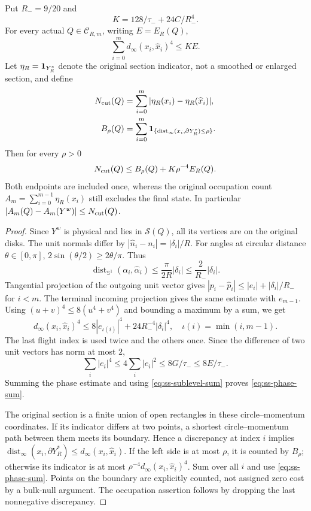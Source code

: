 \begin{theorem}
\label{thm:ss-section}
Put $R_-=9/20$ and
\begin{equation}\label{eq:ss-phase-constant}
 K=128/\tau_-+24C/R_-^4.
\end{equation}
For every actual $Q\in\mathcal C_{R,m}$, writing $E=E_R(Q)$,
\begin{equation}\label{eq:ss-phase-sum}
 \sum_{i=0}^m d_\infty(x_i,\widehat x_i)^4\le KE.
\end{equation}
Let $\eta_R=\mathbf1_{Y_R^*}$ denote the original section indicator, not a
smoothed or enlarged section, and define
\begin{align*}
 N_{\rm cut}(Q)&=\sum_{i=0}^m|\eta_R(x_i)-\eta_R(\widehat x_i)|,\\
 B_\rho(Q)&=\sum_{i=0}^m
  \mathbf1_{\{\operatorname{dist}_\infty(x_i,\partial Y_R^*)\le\rho\}}.
\end{align*}
Then for every $\rho>0$
\begin{equation}\label{eq:ss-section-bound}
 N_{\rm cut}(Q)\le B_\rho(Q)+K\rho^{-4}E_R(Q).
\end{equation}
Both endpoints are included once, whereas the original occupation
count $A_m=\sum_{i=0}^{m-1}\eta_R(x_i)$ still excludes the final
state. In particular
$|A_m(Q)-A_m(Y^w)|\le N_{\rm cut}(Q)$.
\end{theorem}
\begin{proof}
Since $Y^w$ is physical and lies in $\mathcal S(Q)$, all its vertices
are on the original disks. The unit normals differ by
$|\widehat n_i-n_i|=|\delta_i|/R$. For angles at circular distance
$\theta\in[0,\pi]$, $2\sin(\theta/2)\ge2\theta/\pi$.
Thus
\[
 \operatorname{dist}_{\mathbb S^1}(\alpha_i,\widehat\alpha_i)
 \le\frac{\pi}{2R}|\delta_i|\le\frac2{R_-}|\delta_i|.
\]
Tangential projection of the outgoing unit vector gives
$|p_i-\widehat p_i|\le|e_i|+|\delta_i|/R_-$ for $i<m$.
The terminal incoming projection gives the same estimate with
$e_{m-1}$. Using $(u+v)^4\le8(u^4+v^4)$ and bounding a maximum
by a sum, we get
\[
 d_\infty(x_i,\widehat x_i)^4
 \le8|e_{\iota(i)}|^4+24R_-^{-4}|\delta_i|^4,
 \quad\iota(i)=\min(i,m-1).
\]
The last flight index is used twice and the others once. Since the
difference of two unit vectors has norm at most $2$,
\[
 \sum_i|e_i|^4\le4\sum_i|e_i|^2
 \le 8G/\tau_-\le8E/\tau_-.
\]
Summing the phase estimate and using
\eqref{eq:ss-sublevel-sum} proves \eqref{eq:ss-phase-sum}.

The original section is a finite union of open rectangles in these
circle--momentum coordinates. If its indicator differs at two points,
a shortest circle--momentum path between them meets its boundary.
Hence a discrepancy at index $i$ implies
$\operatorname{dist}_\infty(x_i,\partial Y_R^*)
 \le d_\infty(x_i,\widehat x_i)$.
If the left side is at most $\rho$, it is counted by $B_\rho$;
otherwise its indicator is at most
$\rho^{-4}d_\infty(x_i,\widehat x_i)^4$.
Sum over all $i$ and use \eqref{eq:ss-phase-sum}. Points on the
boundary are explicitly counted, not assigned zero cost by a bulk-null
argument. The occupation assertion follows by dropping the last
nonnegative discrepancy.
\end{proof}

